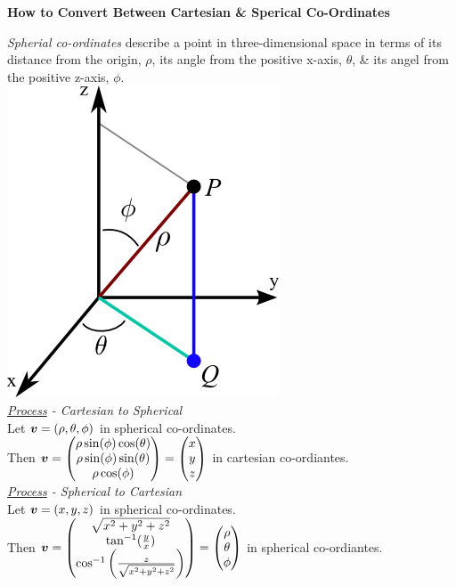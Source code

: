 \documentclass[11pt,a4paper]{article}
\begin{document}
\textbf{How to Convert Between Cartesian \& Sperical Co-Ordinates}\\

\subtitle{Theory}
\textit{Spherial co-ordinates} describe a point in three-dimensional space in terms of its distance from the origin, $\rho$, its angle from the positive x-axis, $\theta$, \& its angel from the positive z-axis, $\phi$.\\
\includegraphics[scale=0.3]{spherical.png}\\

\newpage\textit{\underline{Process} - Cartesian to Spherical}\\
Let $\boldsymbol{v} = (\rho, \theta, \phi)$ in spherical co-ordinates.\\
Then $\boldsymbol{v} = \begin{pmatrix} \rho\sin(\phi)\cos(\theta) \\ \rho\sin(\phi)\sin(\theta) \\ \rho\cos(\phi) \end{pmatrix} = \begin{pmatrix} x\\y\\z \end{pmatrix}$ in cartesian co-ordiantes.\\

\textit{\underline{Process} - Spherical to Cartesian}\\
Let $\boldsymbol{v} = (x, y, z)$ in spherical co-ordinates.\\
Then $\boldsymbol{v} = \begin{pmatrix} \sqrt{x^2 + y^2 + z^2} \\ \tan^{-1}(\frac{y}{x}) \\ \cos^{-1}\left(\frac{z}{\sqrt{x^2 + y^2 + z^2}}\right) \end{pmatrix} = \begin{pmatrix} \rho\\\theta\\\phi \end{pmatrix}$ in spherical co-ordiantes.\\
\end{document}
